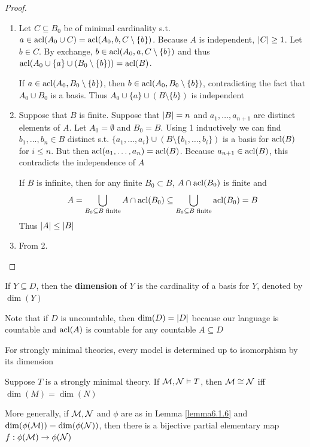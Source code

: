 \documentclass[11pt]{article}
\begin{document}
\begin{proof}
\begin{enumerate}
\item Let \(C\subseteq B_0\) be of minimal cardinality s.t. \(a\in\operatorname{acl}(A_0\cup C)=\operatorname{acl}(A_0,b,C\setminus\{b\})\).
Because \(A\) is
independent, \(\abs{C}\ge 1\). Let \(b\in C\). By exchange, \(b\in\operatorname{acl}(A_0,a,C\setminus\{b\})\) and
thus \(\operatorname{acl}(A_0\cup\{a\}\cup(B_0\setminus\{b\}))=\operatorname{acl}(B)\).

 If \(a\in\operatorname{acl}(A_0,B_0\setminus\{b\})\), then \(b\in\operatorname{acl}(A_0,B_0\setminus\{b\})\), contradicting the fact
that \(A_0\cup B_0\) is a basis. Thus \(A_0\cup\{a\}\cup(B\setminus\{b\})\) is independent
\item Suppose that \(B\) is finite. Suppose that \(\abs{B}=n\) and \(a_1,\dots,a_{n+1}\) are distinct
elements of \(A\). Let \(A_0=\emptyset\) and \(B_0=B\). Using 1 inductively we can
find \(b_1,\dots,b_n\in B\) distinct s.t. \(\{a_1,\dots,a_i\}\cup(B\setminus\{b_1,\dots,b_i\})\) is a basis for \(\operatorname{acl}(B)\)
for \(i\le n\). But then \(\operatorname{acl}(a_1,\dots,a_n)=\operatorname{acl}(B)\). Because \(a_{n+1}\in\operatorname{acl}(B)\), this
contradicts the independence of \(A\)

If \(B\) is infinite, then for any finite \(B_0\subset B\), \(A\cap\operatorname{acl}(B_0)\) is finite and
\begin{equation*}
A=\bigcup_{B_0\subseteq B\text{ finite}}A\cap\operatorname{acl}(B_0)\subseteq\bigcup_{B_0\subseteq B\text{ finite}}\operatorname{acl}(B_0)=B
\end{equation*}
Thus \(\abs{A}\le\abs{B}\)
\item From 2.
\end{enumerate}
\end{proof}

\begin{definition}[]
If \(Y\subseteq D\), then the \textbf{dimension} of \(Y\) is the cardinality of a basis for \(Y\), denoted by \(\dim(Y)\)
\end{definition}

Note that if \(D\) is uncountable, then \(\dim(D)=\abs{D}\) because our language is countable
and \(\operatorname{acl}(A)\) is countable for any countable \(A\subseteq D\)

For strongly minimal theories, every model is determined up to isomorphism by its dimension

\begin{theorem}[]
\label{thm6.1.11}
Suppose \(T\) is a strongly minimal theory. If \(\mathcal{M},\mathcal{N}\vDash T\), then \(\mathcal{M}\cong\mathcal{N}\) iff \(\dim(M)=\dim(N)\)

More generally, if \(\mathcal{M},\mathcal{N}\) and \(\phi\) are as in Lemma \ref{lemma6.1.6} and \(\dim(\phi(\mathcal{M}))=\dim(\phi(\mathcal{N}))\),
then there is a bijective partial elementary map \(f:\phi(\mathcal{M})\to\phi(\mathcal{N})\)
\end{theorem}
\end{document}
